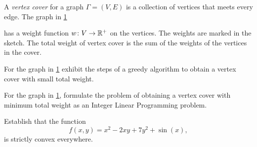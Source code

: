 \titlebox[nynorsk]


A \emph{vertex cover} for a graph
$\Gamma = (V, E)$ is a collection 
of vertices that meets every edge. 
%
The graph in \cref{fig:MAT-2202-31-05-2017-problem-1}
%
\begin{figure}[H]\centering
    \caption{}
    \label{fig:MAT-2202-31-05-2017-problem-1}
\end{figure}
%
has a weight function $\fun[w]{V}{\R^+}$ on the vertices.
The weights are marked in the sketch. The total weight of vertex cover is the sum of the weights of the vertices in the cover.

\begin{subproblem}
    For the graph in \cref{fig:MAT-2202-31-05-2017-problem-1} exhibit the steps of a greedy algorithm
    to obtain a vertex cover with small total weight.
\end{subproblem}

\begin{subproblem}
    For the graph in \cref{fig:MAT-2202-31-05-2017-problem-1}, formulate the problem of obtaining a vertex cover 
    with minimum total weight as an Integer Linear Programming problem.
\end{subproblem}

\newpageNotLF


\begin{subproblem}
    Establish that the function
    \begin{equation}
        f(x, y) = x^2 - 2xy + 7y^2 + \sin(x),
    \end{equation}
    is strictly convex everywhere.
\end{subproblem}

